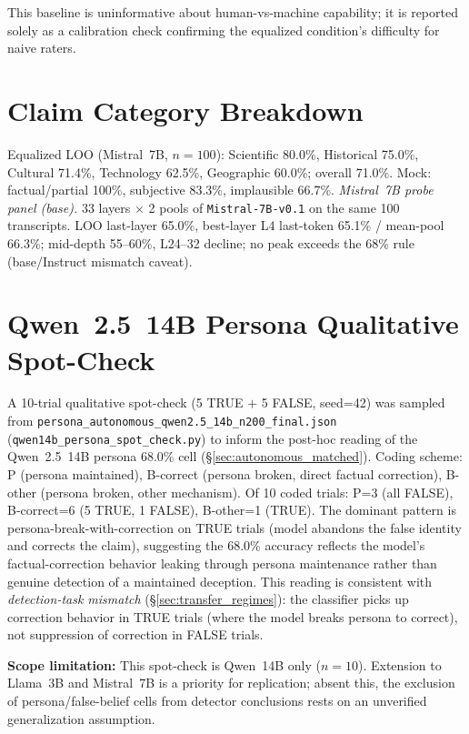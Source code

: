 This baseline is uninformative about human-vs-machine capability; it is reported solely as a calibration check confirming the equalized condition's difficulty for naive raters.

\section{Claim Category Breakdown}
\label{app:diverse_claims_detail}
\label{sec:diverse_claims}

Equalized LOO (Mistral~7B, $n=100$): Scientific 80.0\%, Historical 75.0\%, Cultural 71.4\%, Technology 62.5\%, Geographic 60.0\%; overall 71.0\%. Mock: factual/partial 100\%, subjective 83.3\%, implausible 66.7\%. \emph{Mistral~7B probe panel (base).}\label{app:mistral_probe_panel}\label{tab:mistral_probe_panel} 33 layers $\times$ 2 pools of \texttt{Mistral-7B-v0.1} on the same 100 transcripts. LOO last-layer 65.0\%, best-layer L4 last-token 65.1\% / mean-pool 66.3\%; mid-depth 55--60\%, L24--32 decline; no peak exceeds the 68\% rule (base/Instruct mismatch caveat).

\section{Qwen~2.5~14B Persona Qualitative Spot-Check}
\label{app:qwen_persona_qual}
\label{app:qwen_persona_spotcheck}

A 10-trial qualitative spot-check (5 TRUE $+$ 5 FALSE, seed=42) was sampled from \texttt{persona\_autonomous\_qwen2.5\_14b\_n200\_final.json} (\texttt{qwen14b\_persona\_spot\_check.py}) to inform the post-hoc reading of the Qwen~2.5~14B persona 68.0\% cell (§\ref{sec:autonomous_matched}). Coding scheme: P (persona maintained), B-correct (persona broken, direct factual correction), B-other (persona broken, other mechanism). Of 10 coded trials: P=3 (all FALSE), B-correct=6 (5 TRUE, 1 FALSE), B-other=1 (TRUE). The dominant pattern is persona-break-with-correction on TRUE trials (model abandons the false identity and corrects the claim), suggesting the 68.0\% accuracy reflects the model's factual-correction behavior leaking through persona maintenance rather than genuine detection of a maintained deception. This reading is consistent with \emph{detection-task mismatch} (§\ref{sec:transfer_regimes}): the classifier picks up correction behavior in TRUE trials (where the model breaks persona to correct), not suppression of correction in FALSE trials.

\textbf{Scope limitation:} This spot-check is Qwen~14B only ($n\!=\!10$). Extension to Llama~3B and Mistral~7B is a priority for replication; absent this, the exclusion of persona/false-belief cells from detector conclusions rests on an unverified generalization assumption.

